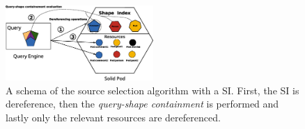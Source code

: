 \begin{figure}
    \centering
    \includegraphics[width=0.5\textwidth]{figure/shape_containement}
    \caption{A schema of the source selection algorithm with a SI. First, the SI is dereference, 
    then the \emph{query-shape containment} is performed and lastly only the relevant resources are dereferenced.}
    \label{fig:shape_index}
\end{figure}